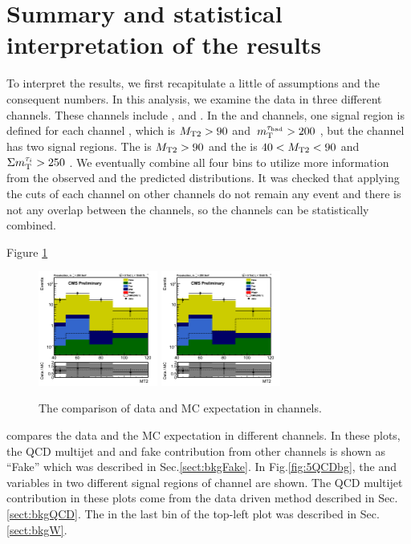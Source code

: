 \section{Summary and statistical interpretation of the results}
\label{sect:stat}
To interpret the results, we first recapitulate a little of assumptions and the consequent numbers.
In this analysis, we examine the data in three different channels.
These channels include \tauTau, \muTau and \eTau.
In the \muTau and \eTau channels, one signal region is defined for each channel , which is ${M_{\rm T2}} > 90$ \GeV and $\,m_{\rm T}^{\tau_{\rm had}} > 200$ \GeV,
but the \tauTau channel has two signal regions.
The \binone is ${M_{\rm T2}} > 90$ \GeV and the \bintwo is $40 < {M_{\rm T2}} < 90$ \GeV and $\Sigma m_{\rm T}^{\tau_i} > 250$ \GeV.
We eventually combine all four bins to utilize more information from the observed and the predicted distributions.
It was checked that applying the cuts of each channel on other channels do not remain any event and 
there is not any overlap between the channels, so the channels can be statistically combined.

Figure \ref{fig:yield_final}
\begin{figure}[h]
\centering
\includegraphics[width=0.35\textwidth,keepaspectratio=true]{StatisticsFig/MT2_tauMTgt200_DDFake.png}
\includegraphics[width=0.35\textwidth,keepaspectratio=true]{StatisticsFig/MT2_tauMTgt200_DDFake.png}
\caption{The comparison of data and MC expectation in \leptonTau channels.}
\label{fig:yield_final}
\end{figure}
compares the data and the MC expectation in different \leptonTau channels. 
In these plots, the QCD multijet and \wjets and fake contribution from other channels is shown 
as ``Fake'' which was described in Sec.\ref{sect:bkgFake}. In Fig.\ref{fig:5QCDbg}, the \mttwo and \SumMT variables in two 
different signal regions of \tauTau channel are shown. The QCD multijet contribution in these plots come from the data driven method described in 
Sec.\ref{sect:bkgQCD}. The \wjets in the last bin of the top-left plot was described in Sec.\ref{sect:bkgW}. 

